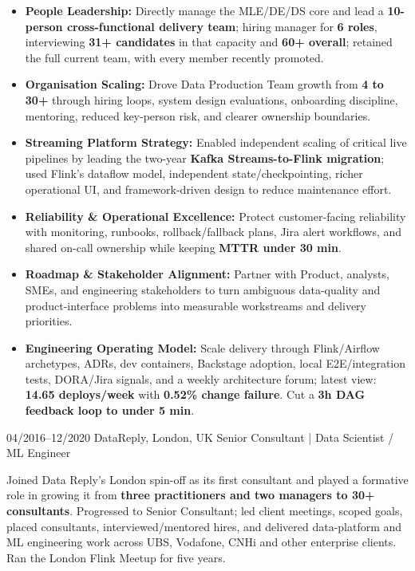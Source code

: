\documentclass[]{../../friggeri-cv}
\begin{document}
\begin{entrylist}
{{        }
        \begin{itemize}[leftmargin=1.1em]
                                                \item \footnotesize\textbf{People Leadership:} Directly manage the MLE/DE/DS core and lead a \textbf{10-person cross-functional delivery team}; hiring manager for \textbf{6 roles}, interviewing \textbf{31+ candidates} in that capacity and \textbf{60+ overall}; retained the full current team, with every member recently promoted.
                                                \item \footnotesize\textbf{Organisation Scaling:} Drove Data Production Team growth from \textbf{4 to 30+} through hiring loops, system design evaluations, onboarding discipline, mentoring, reduced key-person risk, and clearer ownership boundaries.
                                                \item \footnotesize\textbf{Streaming Platform Strategy:} Enabled independent scaling of critical live pipelines by leading the two-year \textbf{Kafka Streams-to-Flink migration}; used Flink's dataflow model, independent state/checkpointing, richer operational UI, and framework-driven design to reduce maintenance effort.
                                                \item \footnotesize\textbf{Reliability \& Operational Excellence:} Protect customer-facing reliability with monitoring, runbooks, rollback/fallback plans, Jira alert workflows, and shared on-call ownership while keeping \textbf{MTTR under 30 min}.
                                                \item \footnotesize\textbf{Roadmap \& Stakeholder Alignment:} Partner with Product, analysts, SMEs, and engineering stakeholders to turn ambiguous data-quality and product-interface problems into measurable workstreams and delivery priorities.
                                                \item \footnotesize\textbf{Engineering Operating Model:} Scale delivery through Flink/Airflow archetypes, ADRs, dev containers, Backstage adoption, local E2E/integration tests, DORA/Jira signals, and a weekly architecture forum; latest view: \textbf{14.65 deploys/week} with \textbf{0.52\% change failure}. Cut a \textbf{3h DAG feedback loop to under 5 min}.
        \end{itemize}
    }
    \entry
    {04/2016--12/2020}
    {DataReply, London, UK}
    {Senior Consultant | Data Scientist / ML Engineer}
    {
        {\small
        \setlength{\parindent}{0pt}
        \setlength{\leftskip}{0pt}
                            Joined Data Reply's London spin-off as its first consultant and played a formative role in growing it from \textbf{three practitioners and two managers to 30+ consultants}. Progressed to Senior Consultant; led client meetings, scoped goals, placed consultants, interviewed/mentored hires, and delivered data-platform and ML engineering work across UBS, Vodafone, CNHi and other enterprise clients. Ran the London Flink Meetup for five years.

}}
\end{entrylist}
\end{document}
